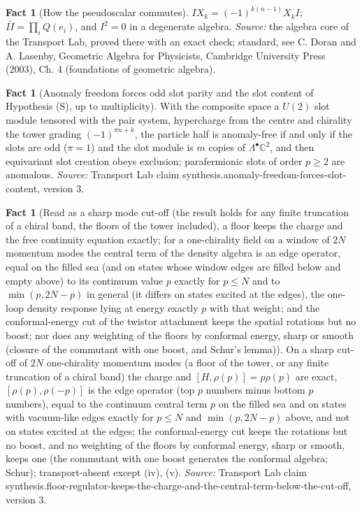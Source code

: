 \documentclass[11pt]{article}
\theoremstyle{definition}
\newtheorem{fact}[theorem]{Fact}
\theoremstyle{plain}
\providecommand{\C}{}\renewcommand{\C}{\mathbb{C}}
\begin{document}
\begin{fact}[How the pseudoscalar commutes]\label{c:std-algebra.pseudoscalar-commutation}
$I X_k = (-1)^{k(n-1)} X_k I$; $I\tilde{I} = \prod_i Q(e_i)$, and $I^{2} = 0$ in a degenerate algebra.
\emph{Source:} the algebra core of the Transport Lab, proved there with an exact check; standard, see C. Doran and A. Lasenby, Geometric Algebra for Physicists, Cambridge University Press (2003), Ch. 4 (foundations of geometric algebra).
\end{fact}

\begin{fact}[Anomaly freedom forces odd slot parity and the slot content of Hypothesis (S), up to multiplicity]\label{c:synthesis.anomaly-freedom-forces-slot-content}
With the composite space a $U(2)$ slot module tensored with the pair system, hypercharge from the centre and chirality the tower grading $(-1)^{\pi n + k}$, the particle half is anomaly-free if and only if the slots are odd ($\pi = 1$) and the slot module is $m$ copies of $\Lambda^{\bullet}\C^{2}$, and then equivariant slot creation obeys exclusion; parafermionic slots of order $p \ge 2$ are anomalous.
\emph{Source:} Transport Lab claim synthesis.anomaly-freedom-forces-slot-content, version 3.
\end{fact}

\begin{fact}[Read as a sharp mode cut-off (the result holds for any finite truncation of a chiral band, the floors of the tower included), a floor keeps the charge and the free continuity equation exactly; for a one-chirality field on a window of $2N$ momentum modes the central term of the density algebra is an edge operator, equal on the filled sea (and on states whose window edges are filled below and empty above) to its continuum value $p$ exactly for $p \le N$ and to $\min(p, 2N - p)$ in general (it differs on states excited at the edges), the one-loop density response lying at energy exactly $p$ with that weight; and the conformal-energy cut of the twistor attachment keeps the spatial rotations but no boost; nor does any weighting of the floors by conformal energy, sharp or smooth (closure of the commutant with one boost, and Schur's lemma)]\label{c:synthesis.floor-regulator-keeps-the-charge-and-the-central-term-below-the-cut-off}
On a sharp cut-off of $2N$ one-chirality momentum modes (a floor of the tower, or any finite truncation of a chiral band) the charge and $[H, \rho(p)] = p\rho(p)$ are exact, $[\rho(p), \rho(-p)]$ is the edge operator (top $p$ numbers minus bottom $p$ numbers), equal to the continuum central term $p$ on the filled sea and on states with vacuum-like edges exactly for $p \le N$ and $\min(p, 2N - p)$ above, and not on states excited at the edges; the conformal-energy cut keeps the rotations but no boost, and no weighting of the floors by conformal energy, sharp or smooth, keeps one (the commutant with one boost generates the conformal algebra; Schur); transport-absent except (iv), (v).
\emph{Source:} Transport Lab claim synthesis.floor-regulator-keeps-the-charge-and-the-central-term-below-the-cut-off, version 3.
\end{fact}
\end{document}
